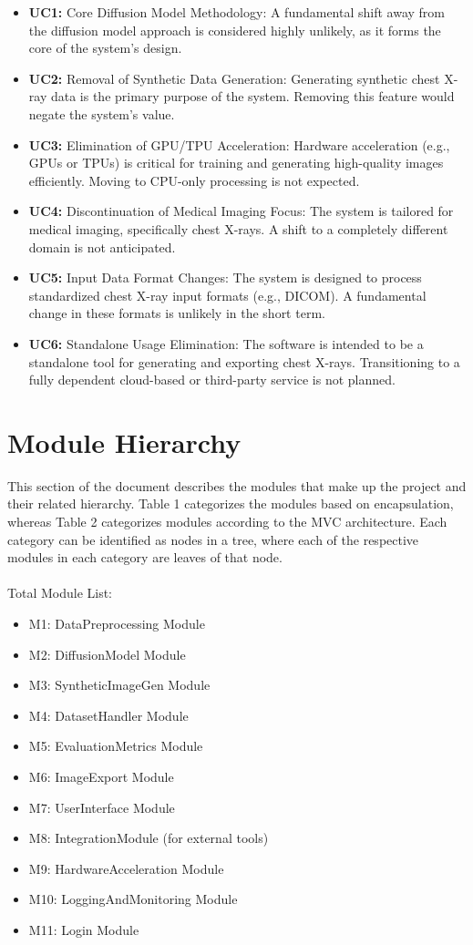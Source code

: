 \documentclass[12pt, titlepage]{article}
\begin{document}
\begin{itemize}
\item \textbf{UC1:} Core Diffusion Model Methodology:
A fundamental shift away from the diffusion model approach is considered highly unlikely, as it forms the core of the system's design.
\item \textbf{UC2:} Removal of Synthetic Data Generation:
Generating synthetic chest X-ray data is the primary purpose of the system. Removing this feature would negate the system’s value.
\item \textbf{UC3:} Elimination of GPU/TPU Acceleration:
Hardware acceleration (e.g., GPUs or TPUs) is critical for training and generating high-quality images efficiently. Moving to CPU-only processing is not expected.
\item \textbf{UC4:} Discontinuation of Medical Imaging Focus:
The system is tailored for medical imaging, specifically chest X-rays. A shift to a completely different domain is not anticipated.
\item \textbf{UC5:} Input Data Format Changes:
The system is designed to process standardized chest X-ray input formats (e.g., DICOM). A fundamental change in these formats is unlikely in the short term.
\item \textbf{UC6:} Standalone Usage Elimination:
The software is intended to be a standalone tool for generating and exporting chest X-rays. Transitioning to a fully dependent cloud-based or third-party service is not planned.
\end{itemize}

\section{Module Hierarchy} \label{SecMH}

This section of the document describes the modules that make up the project and their related hierarchy. Table 1 categorizes the modules based on encapsulation, whereas Table 2 categorizes modules according to the MVC architecture. Each category can be identified as nodes in a tree, where each of the respective modules in each category are leaves of that node.
\\\\
Total Module List:
\begin{itemize}
  \item M1: DataPreprocessing Module
  \item M2: DiffusionModel Module
  \item M3: SyntheticImageGen Module
  \item M4: DatasetHandler Module
  \item M5: EvaluationMetrics Module
  \item M6: ImageExport Module
  \item M7: UserInterface Module
  \item M8: IntegrationModule (for external tools)
  \item M9: HardwareAcceleration Module
  \item M10: LoggingAndMonitoring Module
  \item M11: Login Module
\end{itemize}
\end{document}
